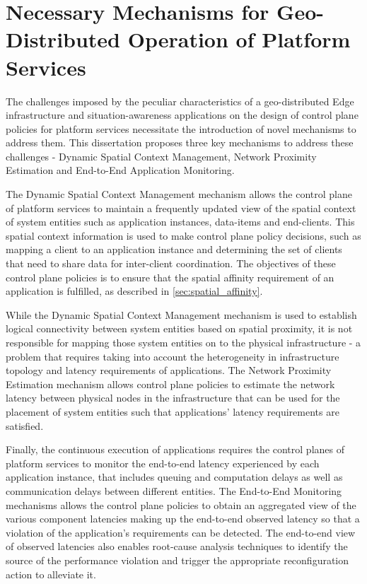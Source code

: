 \chapter{Necessary Mechanisms for Geo-Distributed Operation of Platform Services}
\label{sec:mechanisms}

The challenges imposed by the peculiar characteristics of a geo-distributed Edge infrastructure and situation-awareness applications on the design of control plane policies for platform services necessitate the introduction of novel mechanisms to address them. This dissertation proposes three key mechanisms to address these challenges - Dynamic Spatial Context Management, Network Proximity Estimation and End-to-End Application Monitoring. 
\par The Dynamic Spatial Context Management mechanism allows the control plane of platform services to maintain a frequently updated view of the spatial context of system entities such as application instances, data-items and end-clients. This spatial context information is used to make control plane policy decisions, such as mapping a client to an application instance and determining the set of clients that need to share data for inter-client coordination. The objectives of these control plane policies is to ensure that the spatial affinity requirement of an application is fulfilled, as described in \cref{sec:spatial_affinity}.
\par While the Dynamic Spatial Context Management mechanism is used to establish logical connectivity between system entities based on spatial proximity, it is not responsible for mapping those system entities on to the physical infrastructure - a problem that requires taking into account the  heterogeneity in infrastructure topology and latency requirements of applications. The Network Proximity Estimation mechanism allows control plane policies to estimate the network latency between physical nodes in the infrastructure that can be used for the placement of system entities such that applications' latency requirements are satisfied. 
\par Finally, the continuous execution of applications requires the control planes of platform services to monitor the end-to-end latency experienced by each application instance, that includes queuing and computation delays as well as communication delays between different entities. The End-to-End Monitoring mechanisms allows the control plane policies to obtain an aggregated view of the various component latencies making up the end-to-end observed latency so that a violation of the application's requirements can be detected. The end-to-end view of observed latencies also enables root-cause analysis techniques to identify the source of the performance violation and trigger the appropriate reconfiguration action to alleviate it. 
